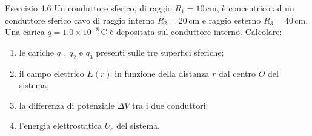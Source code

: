 \documentclass[a4paper]{article}
\begin{document}
\begin{snippetexercise}{Esercizio 4.6}
    Un conduttore sferico, di raggio \(R_1 = 10\,\mathrm{cm}\), è concentrico
    ad un conduttore sferico cavo di raggio interno \(R_2 = 20\,\mathrm{cm}\)
    e raggio esterno \(R_3 = 40\,\mathrm{cm}\). Una carica
    \(q = 1.0 \times 10^{-8}\,\mathrm{C}\) è depositata sul conduttore interno.
    Calcolare:
    \begin{enumerate}[nosep]
        \item le cariche \(q_1\), \(q_2\) e \(q_3\) presenti sulle tre
        superfici sferiche;
        \item il campo elettrico \(E(r)\) in funzione della distanza \(r\)
        dal centro \(O\) del sistema;
        \item la differenza di potenziale \(\Delta V\) tra i due conduttori;
        \item l'energia elettrostatica \(U_e\) del sistema.
    \end{enumerate}
\end{snippetexercise}
\end{document}
